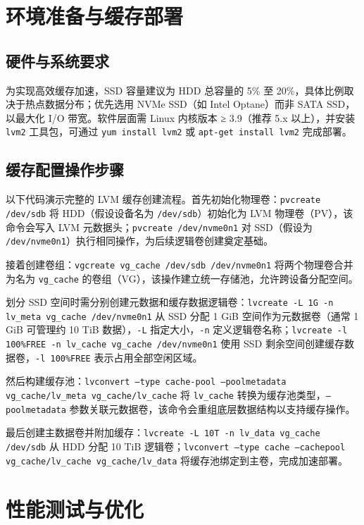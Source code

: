 \chapter{环境准备与缓存部署}
\section{硬件与系统要求}
为实现高效缓存加速，SSD 容量建议为 HDD 总容量的 5\%{} 至 20\%{}，具体比例取决于热点数据分布；优先选用 NVMe SSD（如 Intel Optane）而非 SATA SSD，以最大化 I/O 带宽。软件层面需 Linux 内核版本 ≥ 3.9（推荐 5.x 以上），并安装 \texttt{lvm2} 工具包，可通过 \texttt{yum install lvm2} 或 \texttt{apt-get install lvm2} 完成部署。\par
\section{缓存配置操作步骤}
以下代码演示完整的 LVM 缓存创建流程。首先初始化物理卷：\texttt{pvcreate /dev/sdb} 将 HDD（假设设备名为 \texttt{/dev/sdb}）初始化为 LVM 物理卷（PV），该命令会写入 LVM 元数据头；\texttt{pvcreate /dev/nvme0n1} 对 SSD（假设为 \texttt{/dev/nvme0n1}）执行相同操作，为后续逻辑卷创建奠定基础。\par
接着创建卷组：\texttt{vgcreate vg\_{}cache /dev/sdb /dev/nvme0n1} 将两个物理卷合并为名为 \texttt{vg\_{}cache} 的卷组（VG），该操作建立统一存储池，允许跨设备分配空间。\par
划分 SSD 空间时需分别创建元数据和缓存数据逻辑卷：\texttt{lvcreate -L 1G -n lv\_{}meta vg\_{}cache /dev/nvme0n1} 从 SSD 分配 1 GiB 空间作为元数据卷（通常 1 GiB 可管理约 10 TiB 数据），\texttt{-L} 指定大小，\texttt{-n} 定义逻辑卷名称；\texttt{lvcreate -l 100\%{}FREE -n lv\_{}cache vg\_{}cache /dev/nvme0n1} 使用 SSD 剩余空间创建缓存数据卷，\texttt{-l 100\%{}FREE} 表示占用全部空闲区域。\par
然后构建缓存池：\texttt{lvconvert --type cache-pool --poolmetadata vg\_{}cache/lv\_{}meta vg\_{}cache/lv\_{}cache} 将 \texttt{lv\_{}cache} 转换为缓存池类型，\texttt{--poolmetadata} 参数关联元数据卷，该命令会重组底层数据结构以支持缓存操作。\par
最后创建主数据卷并附加缓存：\texttt{lvcreate -L 10T -n lv\_{}data vg\_{}cache /dev/sdb} 从 HDD 分配 10 TiB 逻辑卷；\texttt{lvconvert --type cache --cachepool vg\_{}cache/lv\_{}cache vg\_{}cache/lv\_{}data} 将缓存池绑定到主卷，完成加速部署。\par
\chapter{性能测试与优化}
